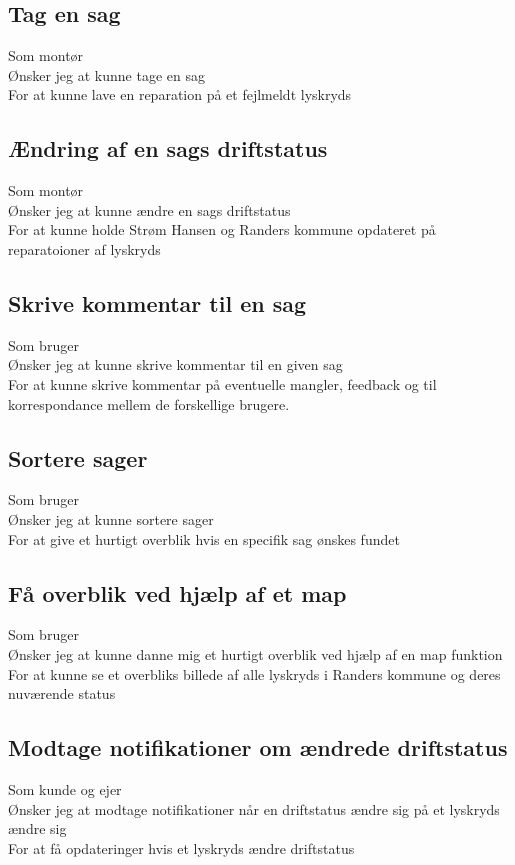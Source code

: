 	\subsection*{Tag en sag}
	Som montør\\
	Ønsker jeg at kunne tage en sag\\
	For at kunne lave en reparation på et fejlmeldt lyskryds
	
	\subsection*{Ændring af en sags driftstatus}
	Som montør\\
	Ønsker jeg at kunne ændre en sags driftstatus\\
	For at kunne holde Strøm Hansen og Randers kommune opdateret på reparatoioner af lyskryds
	
	\subsection*{Skrive kommentar til en sag}
	Som bruger\\
	Ønsker jeg at kunne skrive kommentar til en given sag\\
	For at kunne skrive kommentar på eventuelle mangler, feedback og til korrespondance mellem de forskellige brugere.

	\subsection*{Sortere sager}
	Som bruger\\
	Ønsker jeg at kunne sortere sager\\
	For at give et hurtigt overblik hvis en specifik sag ønskes fundet

	\subsection*{Få overblik ved hjælp af et map}
	Som bruger\\
	Ønsker jeg at kunne danne mig et hurtigt overblik ved hjælp af en map funktion\\
	For at kunne se et overbliks billede af alle lyskryds i Randers kommune  og deres nuværende status
	
	\subsection*{Modtage notifikationer om ændrede driftstatus}
	Som kunde og ejer\\
	Ønsker jeg at modtage notifikationer når en driftstatus ændre sig på et lyskryds ændre sig\\
	For at få opdateringer hvis et lyskryds ændre driftstatus
	
